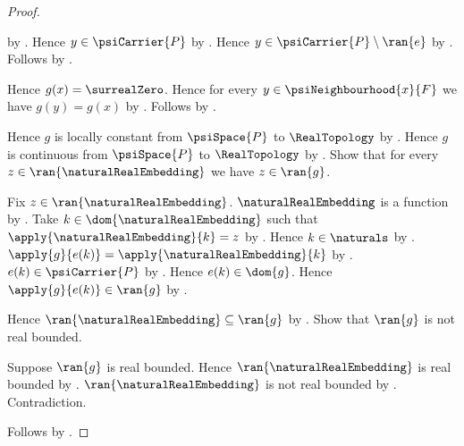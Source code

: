 \begin{proof}
\begin{subproof}
\begin{subproof}
\begin{byCase}
\begin{subproof}
                            by .
                        Hence $y\in\psiCarrier{P}$ by .
                        Hence $y\in\psiCarrier{P}\setminus\ran{e}$ by
                            .
                        Follows by
                            .
                    \end{subproof}
                    Hence $g(x)=\surrealZero$.
                    Hence for every $y\in\psiNeighbourhood{x}{F}$
                        we have $g(y)=g(x)$ by \auto.
                    Follows by \auto.
            \end{byCase}
        \end{subproof}
    \end{subproof}
    Hence $g$ is locally constant from $\psiSpace{P}$ to $\RealTopology$
        by .
    Hence $g$ is continuous from $\psiSpace{P}$ to $\RealTopology$ by
        .
    Show that for every $z\in\ran{\naturalRealEmbedding}$ we have
        $z\in\ran{g}$.
    \begin{subproof}
        Fix $z\in\ran{\naturalRealEmbedding}$.
        $\naturalRealEmbedding$ is a function by
            .
        Take $k\in\dom{\naturalRealEmbedding}$ such that
            $\apply{\naturalRealEmbedding}{k}=z$ by .
        Hence $k\in\naturals$ by
            .
        $\apply{g}{e(k)}=\apply{\naturalRealEmbedding}{k}$ by
            .
        $e(k)\in\psiCarrier{P}$ by
            .
        Hence $e(k)\in\dom{g}$.
        Hence $\apply{g}{e(k)}\in\ran{g}$ by .
    \end{subproof}
    Hence $\ran{\naturalRealEmbedding}\subseteq\ran{g}$ by
        .
    Show that $\ran{g}$ is not real bounded.
    \begin{subproof}
        Suppose $\ran{g}$ is real bounded.
        Hence $\ran{\naturalRealEmbedding}$ is real bounded by
            .
        $\ran{\naturalRealEmbedding}$ is not real bounded by
            .
        Contradiction.
    \end{subproof}
    Follows by
        .
\end{proof}

